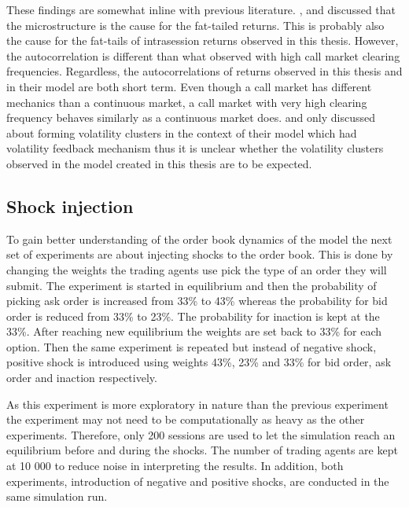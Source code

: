 These findings are somewhat inline with previous literature. \citet{Genoa01}, \citet{Raberto05} and \citet{LIU20082535} 
discussed that the microstructure is the cause for the fat-tailed returns. This is probably also the cause for the
fat-tails of intrasession returns observed in this thesis. However, the autocorrelation is different than what \citet{LIU20082535} 
observed with high call market clearing frequencies. Regardless, the autocorrelations of returns observed in this thesis and in their model
are both short term. Even though a call market has different mechanics than a continuous market, a call market with
very high clearing frequency behaves similarly as a continuous market does. \citet{Genoa01} and \citet{Raberto05} only discussed
about forming volatility clusters in the context of their model which had volatility feedback mechanism thus it is unclear
whether the volatility clusters observed in the model created in this thesis are to be expected.

\subsection{Shock injection}

To gain better understanding of the order book dynamics of the model the next set of experiments are about injecting shocks 
to the order book. This is done by changing the weights the trading agents use pick the type of an order they will submit. 
The experiment is started in equilibrium and then the probability of picking ask order is increased from 33\% to 43\% 
whereas the probability for bid order is reduced from 33\% to 23\%. The probability for inaction is kept at the 33\%. 
After reaching new equilibrium the weights are set back to 33\% for each option. Then the same experiment is repeated 
but instead of negative shock, positive shock is introduced using weights 43\%, 23\% and 33\% for bid order, ask order 
and inaction respectively. 

As this experiment is more exploratory in nature than the previous experiment the experiment may not need to be computationally
as heavy as the other experiments. Therefore, only 200 sessions are used to let the simulation reach an equilibrium before and during 
the shocks. The number of trading agents are kept at 10 000 to reduce noise in interpreting the results. In addition, both experiments, 
introduction of negative and positive shocks, are conducted in the same simulation run.

